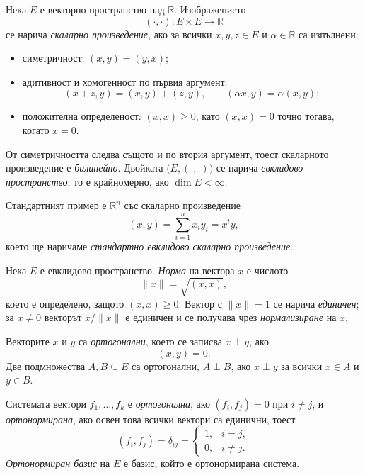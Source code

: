 \begin{defn}
Нека $E$ е векторно пространство над $\mathbb{R}$. Изображението
\[
(\cdot,\cdot):E\times E\to\mathbb{R}
\]
се нарича \emph{скаларно произведение}, ако за всички $x,y,z\in E$ и $\alpha\in\mathbb{R}$ са изпълнени:

\begin{itemize}
\item симетричност: $(x,y)=(y,x)$;
\item адитивност и хомогенност по първия аргумент:
\[
(x+z,y)=(x,y)+(z,y),
\qquad
(\alpha x,y)=\alpha(x,y);
\]
\item положителна определеност: $(x,x)\geq 0$, като $(x,x)=0$ точно тогава, когато $x=0$.
\end{itemize}

От симетричността следва същото и по втория аргумент, тоест скаларното произведение е \emph{билинейно}. Двойката $\bigl(E,(\cdot,\cdot)\bigr)$ се нарича \emph{евклидово пространство}; то е крайномерно, ако $\dim E<\infty$.
\end{defn}

Стандартният пример е $\mathbb{R}^n$ със скаларно произведение
\[
(x,y)=\sum_{i=1}^n x_iy_i=x^ty,
\]
което ще наричаме \emph{стандартно евклидово скаларно произведение}.

\begin{defn}
Нека $E$ е евклидово пространство. \emph{Норма} на вектора $x$ е числото
\[
\|x\|=\sqrt{(x,x)},
\]
което е определено, защото $(x,x)\geq0$. Вектор с $\|x\|=1$ се нарича \emph{единичен}; за $x\ne0$ векторът $x/\|x\|$ е единичен и се получава чрез \emph{нормализиране} на $x$.

Векторите $x$ и $y$ са \emph{ортогонални}, което се записва $x\perp y$, ако
\[
(x,y)=0.
\]
Две подмножества $A,B\subseteq E$ са ортогонални, $A\perp B$, ако $x\perp y$ за всички $x\in A$ и $y\in B$.
\end{defn}

\begin{defn}
Системата вектори $f_1,\ldots,f_k$ е \emph{ортогонална}, ако $(f_i,f_j)=0$ при $i\ne j$, и \emph{ортонормирана}, ако освен това всички вектори са единични, тоест
\[
(f_i,f_j)=\delta_{ij}=
\begin{cases}
1, & i=j,\\
0, & i\ne j.
\end{cases}
\]
\emph{Ортонормиран базис} на $E$ е базис, който е ортонормирана система.
\end{defn}

